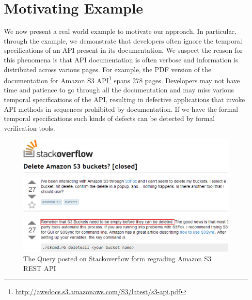 \section{Motivating Example}
\label{sec:example}

We now present a real world example to motivate our approach. In particular, through the example, we demonstrate that developers often ignore the temporal specifications of an API present in its documentation. We suspect the reason for this phenomena is that API documentation is often verbose and information is distributed across various
pages. For example, the PDF version of the documentation for Amazon S3 API\footnote{\url{http://awsdocs.s3.amazonaws.com/S3/latest/s3-api.pdf}} spans 278 pages. Developers may not have time and patience to go through all the documentation and may miss various temporal specifications of the API, resulting in defective applications that invoke API methods in sequences prohibited by documentation. 
If we have the formal temporal specifications such kinds of defects can be detected by formal verification tools.

\begin{figure}[t]
\begin{center}
\includegraphics[scale=0.45]{Stackoverflow.eps}
\end{center}
\caption{\label{fig:Stackoverflow} The Query posted on Stackoverflow form regrading Amazon S3 REST API}
\end{figure}

